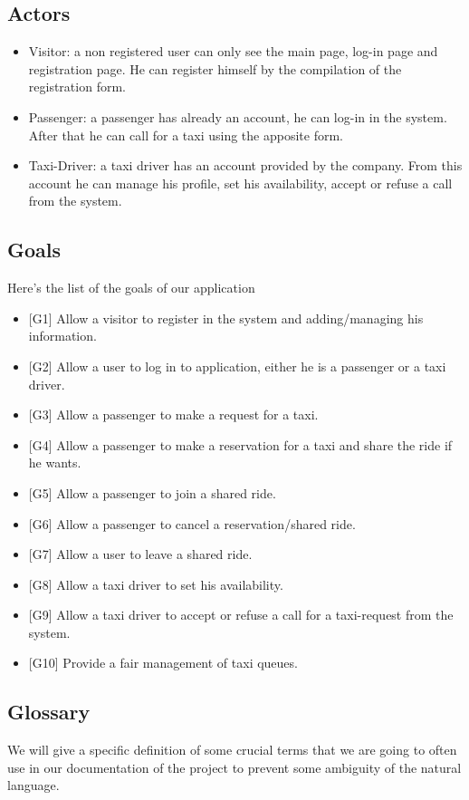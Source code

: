 \subsection{Actors}
	\begin{itemize}
		\item Visitor: a non registered user can only see the main page, log-in page and registration page. He can register himself by the compilation of the registration form.
		\item Passenger: a passenger has already an account, he can log-in in the system. After that he can call for a taxi using the apposite form.
		\item Taxi-Driver: a taxi driver has an account provided by the company. From this account he can manage his profile, set his availability, accept or refuse a call from the system. 
	\end{itemize}

\subsection{Goals}
	Here's the list of the goals of our application
	\begin{itemize}
		\item {[G1]} Allow a visitor to register in the system and adding/managing his information.
		\item {[G2]} Allow a user to log in to application, either he is a passenger or a taxi driver.
		\item {[G3]} Allow a passenger to make a request for a taxi.
		\item {[G4]} Allow a passenger to make a reservation for a taxi and share the ride if he wants.
		\item {[G5]} Allow a passenger to join a shared ride.
		\item {[G6]} Allow a passenger to cancel a reservation/shared ride.
		\item {[G7]} Allow a user to leave a shared ride.
		\item {[G8]} Allow a taxi driver to set his availability.
		\item {[G9]} Allow a taxi driver to accept or refuse a call for a taxi-request from the system.
		\item {[G10]} Provide a fair management of taxi queues.
	\end{itemize}

\subsection{Glossary}
We will give a specific definition of some crucial terms that we are going to often use in our documentation of the project to prevent some ambiguity of the natural language.

